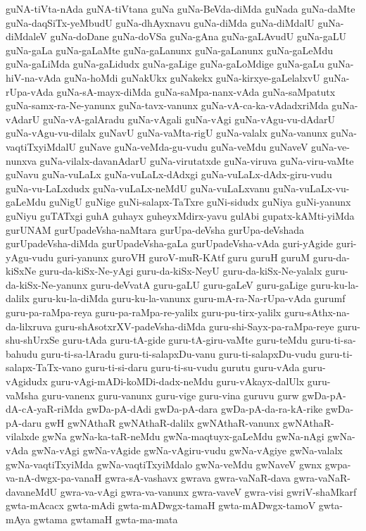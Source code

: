 {guNA-tiVta-nAda
guNA-tiVtana
guNa
guNa-BeVda-diMda
guNada
guNa-daMte
guNa-daqSiTx-yeMbudU
guNa-dhAyxnavu
guNa-diMda
guNa-diMdalU
guNa-diMdaleV
guNa-doDane
guNa-doVSa
guNa-gAna
guNa-gaLAvudU
guNa-gaLU
guNa-gaLa
guNa-gaLaMte
guNa-gaLanunx
guNa-gaLanunx
guNa-gaLeMdu
guNa-gaLiMda
guNa-gaLidudx
guNa-gaLige
guNa-gaLoMdige
guNa-gaLu
guNa-hiV-na-vAda
guNa-hoMdi
guNakUkx
guNakekx
guNa-kirxye-gaLelalxvU
guNa-rUpa-vAda
guNa-sA-mayx-diMda
guNa-saMpa-nanx-vAda
guNa-saMpatutx
guNa-samx-ra-Ne-yanunx
guNa-tavx-vanunx
guNa-vA-ca-ka-vAdadxriMda
guNa-vAdarU
guNa-vA-galAradu
guNa-vAgali
guNa-vAgi
guNa-vAgu-vu-dAdarU
guNa-vAgu-vu-dilalx
guNavU
guNa-vaMta-rigU
guNa-valalx
guNa-vanunx
guNa-vaqtiTxyiMdalU
guNave
guNa-veMda-gu-vudu
guNa-veMdu
guNaveV
guNa-ve-nunxva
guNa-vilalx-davanAdarU
guNa-virutatxde
guNa-viruva
guNa-viru-vaMte
guNavu
guNa-vuLaLx
guNa-vuLaLx-dAdxgi
guNa-vuLaLx-dAdx-giru-vudu
guNa-vu-LaLxdudx
guNa-vuLaLx-neMdU
guNa-vuLaLxvanu
guNa-vuLaLx-vu-gaLeMdu
guNigU
guNige
guNi-salapx-TaTxre
guNi-sidudx
guNiya
guNi-yanunx
guNiyu
guTATxgi
guhA
guhayx
guheyxMdirx-yavu
gulAbi
gupatx-kAMti-yiMda
gurUNAM
gurUpadeVsha-naMtara
gurUpa-deVsha
gurUpa-deVshada
gurUpadeVsha-diMda
gurUpadeVsha-gaLa
gurUpadeVsha-vAda
guri-yAgide
guri-yAgu-vudu
guri-yanunx
guroVH
guroV-muR-KAtf
guru
guruH
guruM
guru-da-kiSxNe
guru-da-kiSx-Ne-yAgi
guru-da-kiSx-NeyU
guru-da-kiSx-Ne-yalalx
guru-da-kiSx-Ne-yanunx
guru-deVvatA
guru-gaLU
guru-gaLeV
guru-gaLige
guru-ku-la-dalilx
guru-ku-la-diMda
guru-ku-la-vanunx
guru-mA-ra-Na-rUpa-vAda
gurumf
guru-pa-raMpa-reya
guru-pa-raMpa-re-yalilx
guru-pu-tirx-yalilx
guru-sAthx-na-da-lilxruva
guru-shAsotxrXV-padeVsha-diMda
guru-shi-Sayx-pa-raMpa-reye
guru-shu-shUrxSe
guru-tAda
guru-tA-gide
guru-tA-giru-vaMte
guru-teMdu
guru-ti-sa-bahudu
guru-ti-sa-lAradu
guru-ti-salapxDu-vanu
guru-ti-salapxDu-vudu
guru-ti-salapx-TaTx-vano
guru-ti-si-daru
guru-ti-su-vudu
gurutu
guru-vAda
guru-vAgidudx
guru-vAgi-mADi-koMDi-dadx-neMdu
guru-vAkayx-dalUlx
guru-vaMsha
guru-vanenx
guru-vanunx
guru-vige
guru-vina
guruvu
gurw
gwDa-pA-dA-cA-yaR-riMda
gwDa-pA-dAdi
gwDa-pA-dara
gwDa-pA-da-ra-kA-rike
gwDa-pA-daru
gwH
gwNAthaR
gwNAthaR-dalilx
gwNAthaR-vanunx
gwNAthaR-vilalxde
gwNa
gwNa-ka-taR-neMdu
gwNa-maqtuyx-gaLeMdu
gwNa-nAgi
gwNa-vAda
gwNa-vAgi
gwNa-vAgide
gwNa-vAgiru-vudu
gwNa-vAgiye
gwNa-valalx
gwNa-vaqtiTxyiMda
gwNa-vaqtiTxyiMdalo
gwNa-veMdu
gwNaveV
gwnx
gwpa-va-nA-dwgx-pa-vanaH
gwra-sA-vashavx
gwrava
gwra-vaNaR-dava
gwra-vaNaR-davaneMdU
gwra-va-vAgi
gwra-va-vanunx
gwra-vaveV
gwra-visi
gwriV-shaMkarf
gwta-mAcacx
gwta-mAdi
gwta-mADwgx-tamaH
gwta-mADwgx-tamoV
gwta-mAya
gwtama
gwtamaH
gwta-ma-mata
}
